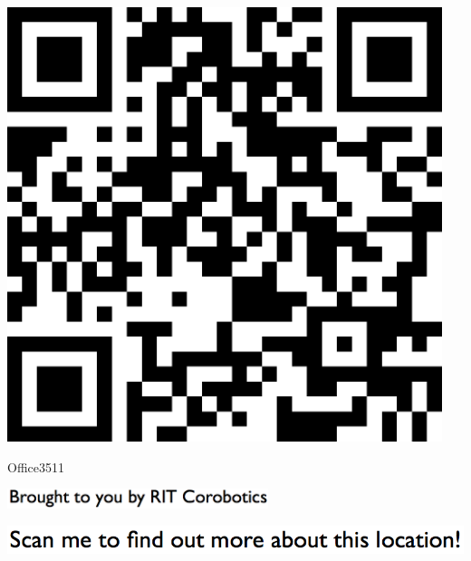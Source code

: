 \documentclass[letterpaper]{article}
\begin{document}
 \begingroup 
 \centerline{\includegraphics[scale=1,width=5in,height=5in]{Office3511.png}} 
 \endgroup 
 \vspace*{\fill} 

 \hfill{\small Office3511} 

  \vspace{0.7in} 
 
 \centerline{\includegraphics[scale=1,width=3in]{text-bottom.png}} 
 
 \pagebreak 
{} 
 \vspace*{\fill} 
 
  \centerline{\includegraphics[scale=1,width=6in]{text-top.png}} 
 
 \vspace{0.5in} 
 
\end{document}
